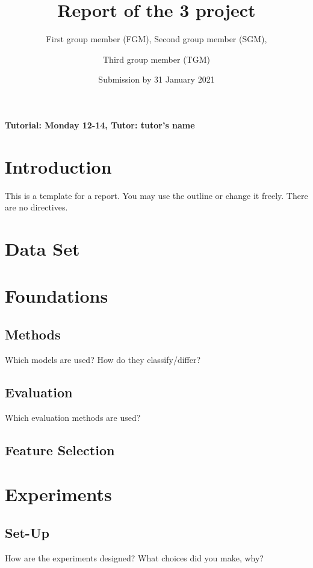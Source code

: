 \documentclass[a4paper,12pt]{article}
\title{Report of the 3\ts{rd} project}
\author{First group member (FGM), Second group member (SGM), \and
Third group member (TGM)}
\date{Submission by 31\ts{st} January 2021}
\newcommand{\initials}[1]{\marginpar{\quad\texttt{#1}}}
\begin{document}

\pagestyle{myheadings}
    
\maketitle

\begin{center}
    \textbf{Tutorial: Monday 12-14, Tutor: tutor's name}
\end{center}

\section{Introduction}
This is a template for a report. You may use the outline or change it freely. There are no directives.

\section{Data Set}
\initials{TGM}

\section{Foundations}

\subsection{Methods}
Which models are used? How do they classify/differ? 

\subsection{Evaluation}
Which evaluation methods are used?

\subsection{Feature Selection}
\initials{FGM}

\section{Experiments}

\subsection{Set-Up}
How are the experiments designed? What choices did you make, why?
\end{document}
